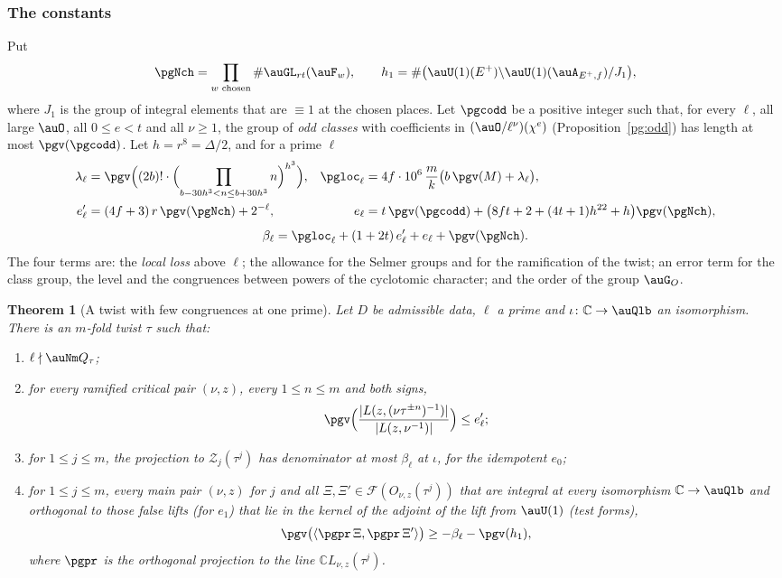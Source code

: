 \documentclass[10pt]{amsart}
\newtheorem{theorem}{Theorem}[section]
\theoremstyle{definition}
\theoremstyle{remark}
\newcommand{\C}{\mathbb C}
\begin{document}
\subsubsection*{The constants}
Put
\[
\pgNch=\prod_{w\text{ chosen}}\#\auGL_{rt}(\auF_w),\qquad h_1=\#\bigl(\auU(1)(E^+)\backslash
\auU(1)(\auA_{E^+,f})/J_1\bigr),
\]
where $J_1$ is the group of integral elements that are $\equiv1$ at the chosen places. Let
$\pgcodd$ be a positive integer such that, for every $\ell$, all large $\auO$, all $0\le e<t$ and
all $\nu\ge1$, the group of \emph{odd classes} with coefficients in $(\auO/\ell^\nu)(\chi^e)$
(Proposition~\ref{pg:odd}) has length at most $\pgv(\pgcodd)$. Let $h=r^8=\Delta/2$, and for a prime
$\ell$
\begin{align*}
\lambda_\ell&=\pgv\Bigl((2b)!\cdot\Bigl(\prod_{b-30h^3<n\le b+30h^3}n\Bigr)^{h^3}\Bigr),&
\pgloc_\ell&=4f\cdot10^6\,\frac mk\bigl(b\,\pgv(M)+\lambda_\ell\bigr),\\
e'_\ell&=(4f+3)\,r\,\pgv(\pgNch)+2^{-\ell},&
e_\ell&=t\,\pgv(\pgcodd)+\bigl(8ft+2+(4t+1)h^{22}+h\bigr)\pgv(\pgNch),
\end{align*}
\begin{equation}\label{pg:eq-beta}
\beta_\ell=\pgloc_\ell+(1+2t)\,e'_\ell+e_\ell+\pgv(\pgNch).
\end{equation}
The four terms are: the \emph{local loss} above $\ell$; the allowance for the Selmer groups and
for the ramification of the twist; an error term for the class group, the level and the
congruences between powers of the cyclotomic character; and the order of the group $\auG_O$.

\begin{theorem}[A twist with few congruences at one prime]\label{pg:main}
Let $D$ be admissible data, $\ell$ a prime and $\iota\colon\C\to\auQlb$ an isomorphism. There is an
$m$-fold twist $\tau$ such that:
\begin{enumerate}
\item[(a)] $\ell\nmid\auNm Q_\tau$;
\item[(b)] for every ramified critical pair $(\nu,z)$, every $1\le n\le m$ and both signs,
\[
\pgv\Bigl(\frac{|L(z,(\nu\tau^{\pm n})^{-1})|}{|L(z,\nu^{-1})|}\Bigr)\le e'_\ell;
\]
\item[(c)] for $1\le j\le m$, the projection to $\mathcal Z_j(\tau^j)$ has denominator at most
$\beta_\ell$ at $\iota$, for the idempotent $e_0$;
\item[(d)] for $1\le j\le m$, every main pair $(\nu,z)$ for $j$ and all $\Xi,\Xi'\in\mathcal
F(O_{\nu,z}(\tau^j))$ that are integral at every isomorphism $\C\to\auQlb$ and orthogonal to those
false lifts (for $e_1$) that lie in the kernel of the adjoint of the lift from $\auU(1)$
(\emph{test forms}),
\[
\pgv\bigl(\langle\pgpr\,\Xi,\pgpr\,\Xi'\rangle\bigr)\ge-\beta_\ell-\pgv(h_1),
\]
where $\pgpr$ is the orthogonal projection to the line $\C L_{\nu,z}(\tau^j)$.
\end{enumerate}
\end{theorem}
\end{document}
